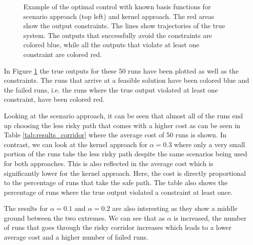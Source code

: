 \begin{figure}[t!]
{
 }
\caption{Example of the optimal control with known basis functions for scenario approach (top left) and kernel approach. The red areas show the output constraints. The lines show trajectories of the true system. The outputs that successfully avoid the constraints are colored blue, while all the outputs that violate at least one constraint are colored red.}

\label{ScenarioKernelComparisonCorridor}
\end{figure}

In Figure \ref{ScenarioKernelComparisonCorridor} the true outputs for these 50 runs have been plotted as well as the constraints. The runs that arrive at a feasible solution have been colored blue and the failed runs, i.e. the runs where the true output violated at least one constraint, have been colored red. 

Looking at the scenario approach, it can be seen that almost all of the runs end up choosing the less risky path that comes with a higher cost as can be seen in Table \ref{tab:results_corridor} where the average cost of 50 runs is shown.  In contrast, we can look at the kernel approach for $\alpha = 0.3$ where only a very small portion of the runs take the less risky path despite the same scenarios being used for both approaches. This is also reflected in the average cost which is significantly lower for the kernel approach. Here, the cost is directly proportional to the percentage of runs that take the safe path. The table also shows the percentage of runs where the true output violated a constraint at least once. 


The results for $\alpha = 0.1$ and $\alpha = 0.2$ are also interesting as they show a middle ground between the two extremes. We can see that as $\alpha$ is increased, the number of runs that goes through the risky corridor increases which leads to a lower average cost and a higher number of failed runs. 


